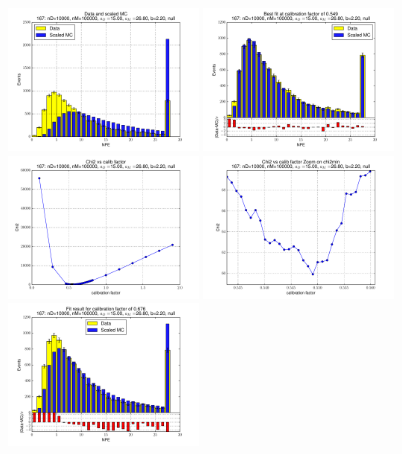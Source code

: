 
 \begin{figure}[htbp] \begin{center} 
\includegraphics[width=0.45\textwidth]{../FIGURES/167/FIG_Data_and_scaled_MC.pdf} 
\includegraphics[width=0.45\textwidth]{../FIGURES/167/FIG_Best_fit_at_calibration_factor_of_0_549.pdf} 
\includegraphics[width=0.45\textwidth]{../FIGURES/167/FIG_Chi2_vs_calib_factor.pdf} 
\includegraphics[width=0.45\textwidth]{../FIGURES/167/FIG_Chi2_vs_calib_factor_Zoom_on_chi2min.pdf} 
\includegraphics[width=0.45\textwidth]{../FIGURES/167/FIG_Fit_result_for_calibration_factor_of_0_676.pdf} 

\end{center}
\end{figure}
